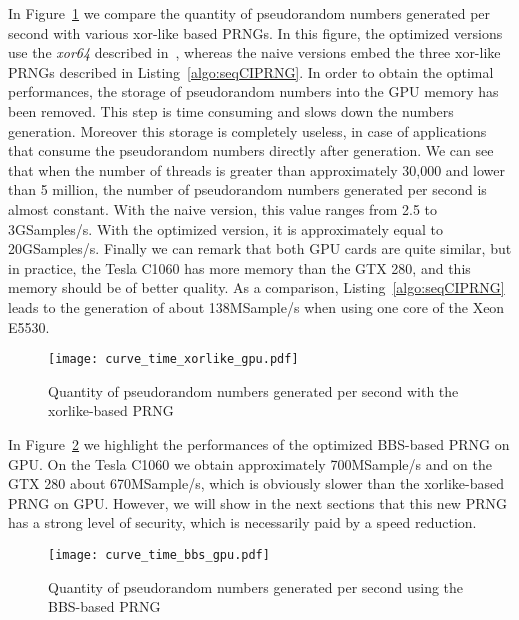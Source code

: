 \documentclass{article}
\begin{document}
In  Figure~\ref{fig:time_xorlike_gpu} we  compare the  quantity of  pseudorandom numbers
generated per second with various xor-like based PRNGs. In this figure, the optimized
versions use the {\it xor64} described in~\cite{Marsaglia2003}, whereas the naive versions
embed  the three  xor-like  PRNGs described  in Listing~\ref{algo:seqCIPRNG}.   In
order to obtain the optimal performances, the storage of pseudorandom numbers
into the GPU memory has been removed. This step is time consuming and slows down the numbers
generation.  Moreover this   storage  is  completely
useless, in case of applications that consume the pseudorandom
numbers  directly   after generation. We can see  that when the number of  threads is greater
than approximately 30,000 and lower than 5 million, the number of pseudorandom numbers generated
per second  is almost constant.  With the  naive version, this value ranges from 2.5 to
3GSamples/s.   With  the  optimized   version,  it  is  approximately  equal to
20GSamples/s. Finally  we can remark  that both GPU  cards are quite  similar, but in
practice,  the Tesla C1060  has more  memory than  the GTX  280, and  this memory
should be of better quality.
As a  comparison,   Listing~\ref{algo:seqCIPRNG}  leads   to the  generation of  about
138MSample/s when using one core of the Xeon E5530.

\begin{figure}[htbp]
\begin{center}
  \texttt{[image: curve\_time\_xorlike\_gpu.pdf]}
\end{center}
\caption{Quantity of pseudorandom numbers generated per second with the xorlike-based PRNG}
\label{fig:time_xorlike_gpu}
\end{figure}





In Figure~\ref{fig:time_bbs_gpu} we highlight  the performances of the optimized
BBS-based PRNG on GPU.  On  the Tesla C1060 we obtain approximately 700MSample/s
and  on the  GTX 280  about  670MSample/s, which  is obviously  slower than  the
xorlike-based PRNG on GPU. However, we  will show in the next sections that this
new PRNG  has a strong  level of  security, which is  necessarily paid by  a speed
reduction.

\begin{figure}[htbp]
\begin{center}
  \texttt{[image: curve\_time\_bbs\_gpu.pdf]}
\end{center}
\caption{Quantity of pseudorandom numbers generated per second using the BBS-based PRNG}
\label{fig:time_bbs_gpu}
\end{figure}
\end{document}
